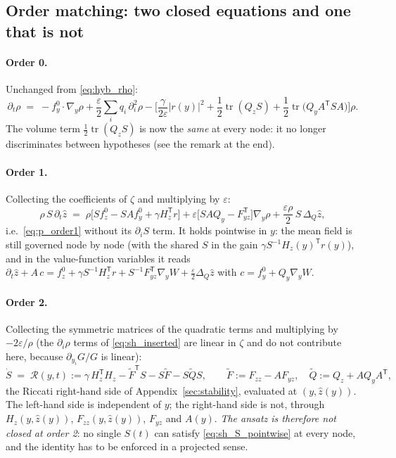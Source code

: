 \documentclass[11pt,a4paper]{article}
\newcommand{\tr}{\operatorname{tr}}
\newcommand{\T}{^{\mathsf T}}
\newcommand{\zh}{\hat{z}}
\newcommand{\eps}{\varepsilon}
\newcommand{\abs}[1]{\left\lvert #1 \right\rvert}
\newcommand{\gy}{\nabla_{\!y}}
\theoremstyle{plain}
\theoremstyle{definition}
\theoremstyle{remark}
\begin{document}
\subsection{Order matching: two closed equations and one that is not}

\paragraph{Order 0.} Unchanged from \eqref{eq:hyb_rho}:
\begin{equation}
  \partial_t\rho \;=\; -f_y^0\cdot\gy\rho + \frac\eps2\sum_iq_i\,\partial_i^2\rho
  - \Big[\frac{\gamma}{2\eps}\abs{r(y)}^2 + \frac12\tr(Q_zS) + \frac12\tr\big(Q_yA\T SA\big)\Big]\rho .
  \label{eq:sh_rho}
\end{equation}
The volume term $\tfrac12\tr(Q_zS)$ is now the \emph{same} at every node: it no longer discriminates between hypotheses (see the remark at the end).

\paragraph{Order 1.} Collecting the coefficients of $\zeta$ and multiplying by $\eps$:
\begin{equation}
  \rho\,S\,\partial_t\zh \;=\; \rho\Big[Sf_z^0 - SAf_y^0 + \gamma H_z\T r\Big] + \eps\big[SAQ_y - F_{yz}\T\big]\gy\rho + \frac{\eps\rho}2\,S\,\Delta_Q\zh ,
  \label{eq:sh_z}
\end{equation}
i.e.\ \eqref{eq:p_order1} without its $\partial_iS$ term. It holds pointwise in $y$: the mean field is still governed node by node (with the shared $S$ in the gain $\gamma S^{-1}H_z(y)\T r(y)$), and in the value-function variables it reads $\partial_t\zh + A\,c = f_z^0 + \gamma S^{-1}H_z\T r + S^{-1}F_{yz}\T\gy W + \tfrac\eps2\Delta_Q\zh$ with $c = f_y^0+Q_y\gy W$.

\paragraph{Order 2.} Collecting the symmetric matrices of the quadratic terms and multiplying by $-2\eps/\rho$ (the $\partial_i\rho$ terms of \eqref{eq:sh_inserted} are linear in $\zeta$ and do not contribute here, because $\partial_{y_i}G/G$ is linear):
\begin{equation}
  \dot S \;=\; \mathcal R(y,t) := \gamma\,H_z\T H_z - \tilde F\T S - S\tilde F - S\tilde QS,
  \qquad \tilde F := F_{zz}-AF_{yz},\quad \tilde Q := Q_z + AQ_yA\T ,
  \label{eq:sh_S_pointwise}
\end{equation}
the Riccati right-hand side of Appendix~\ref{sec:stability}, evaluated at $(y,\zh(y))$. The left-hand side is independent of $y$; the right-hand side is not, through $H_z(y,\zh(y))$, $F_{zz}(y,\zh(y))$, $F_{yz}$ and $A(y)$. \emph{The ansatz is therefore not closed at order 2}: no single $S(t)$ can satisfy \eqref{eq:sh_S_pointwise} at every node, and the identity has to be enforced in a projected sense.
\end{document}
